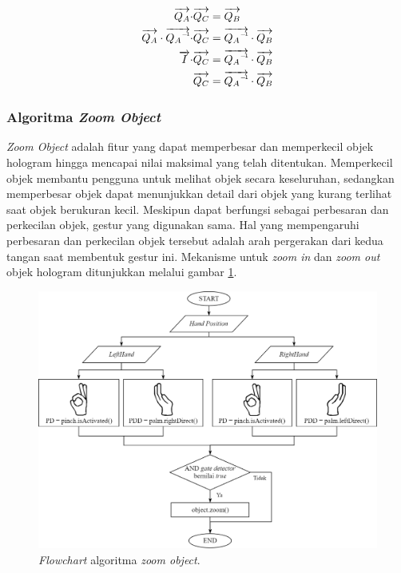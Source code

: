 			\begin{equation}
				\begin{alignedat}{3}
					\overrightarrow{Q_{A}} \cdot & \overrightarrow{Q_{C}} &&= \overrightarrow{Q_{B}}\\ 
					\overrightarrow{Q_{A}} \cdot \overrightarrow{\inv{Q_{A}}} \cdot& \overrightarrow{Q_{C}} &&= \overrightarrow{\inv{Q_{A}}} \cdot \overrightarrow{Q_{B}}\\
					\overrightarrow{I} \cdot & \overrightarrow{Q_{C}} &&= \overrightarrow{\inv{Q_{A}}} \cdot \overrightarrow{Q_{B}}\\
					&\overrightarrow{Q_{C}} &&= \overrightarrow{\inv{Q_{A}}} \cdot \overrightarrow{Q_{B}}\\
				\end{alignedat}
				\label{eqn:rotation_target}
			\end{equation}
		\vspace{0.75ex}
		
		\subsubsection{Algoritma \textit{Zoom Object}} \label{section:zoom}
		\vspace{0.5ex}
			\textit{Zoom Object} adalah fitur yang dapat memperbesar dan memperkecil objek hologram hingga mencapai nilai maksimal yang telah ditentukan. Memperkecil objek membantu pengguna untuk melihat objek secara keseluruhan, sedangkan memperbesar objek dapat menunjukkan detail dari objek yang kurang terlihat saat objek berukuran kecil. Meskipun dapat berfungsi sebagai perbesaran dan perkecilan objek, gestur yang digunakan sama. Hal yang mempengaruhi perbesaran dan perkecilan objek tersebut adalah arah pergerakan dari kedua tangan saat membentuk gestur ini. Mekanisme untuk \textit{zoom in} dan \textit{zoom out} objek hologram ditunjukkan melalui gambar \ref{fig:flow_zoom}.
			\begin{figure} [H]
				\includegraphics[width=\textwidth]{img/bab3/flow_zoom.png}
				\caption{\textit{Flowchart} algoritma \textit{zoom object}.}
				\label{fig:flow_zoom}
			\end{figure}
			\vspace{-2ex}
		
